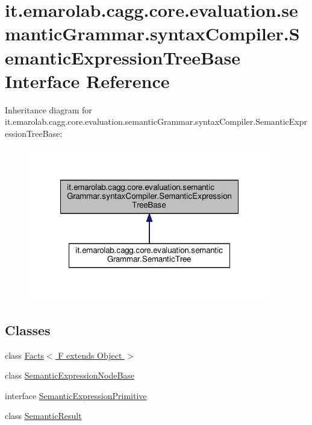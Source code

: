 \hypertarget{interfaceit_1_1emarolab_1_1cagg_1_1core_1_1evaluation_1_1semanticGrammar_1_1syntaxCompiler_1_1SemanticExpressionTreeBase}{\section{it.\-emarolab.\-cagg.\-core.\-evaluation.\-semantic\-Grammar.\-syntax\-Compiler.\-Semantic\-Expression\-Tree\-Base Interface Reference}
\label{interfaceit_1_1emarolab_1_1cagg_1_1core_1_1evaluation_1_1semanticGrammar_1_1syntaxCompiler_1_1SemanticExpressionTreeBase}
}


Inheritance diagram for it.\-emarolab.\-cagg.\-core.\-evaluation.\-semantic\-Grammar.\-syntax\-Compiler.\-Semantic\-Expression\-Tree\-Base\-:\nopagebreak
\begin{figure}[H]
\begin{center}
\leavevmode
\includegraphics[width=300pt]{interfaceit_1_1emarolab_1_1cagg_1_1core_1_1evaluation_1_1semanticGrammar_1_1syntaxCompiler_1_1Sef31807ec4d0212bc6fd9cf71e3d1ef47}
\end{center}
\end{figure}
\subsection*{Classes}
\begin{DoxyCompactItemize}
\item 
class \hyperlink{classit_1_1emarolab_1_1cagg_1_1core_1_1evaluation_1_1semanticGrammar_1_1syntaxCompiler_1_1Semanta17363eb7db3bfea12328c626a3d6723}{Facts$<$ F extends Object $>$}
\item 
class \hyperlink{classit_1_1emarolab_1_1cagg_1_1core_1_1evaluation_1_1semanticGrammar_1_1syntaxCompiler_1_1Semantec1f2fc886c35d505e2bc10592e2dff6}{Semantic\-Expression\-Node\-Base}
\item 
interface \hyperlink{interfaceit_1_1emarolab_1_1cagg_1_1core_1_1evaluation_1_1semanticGrammar_1_1syntaxCompiler_1_1Se776f6389441f31f1bb3271e5a57601d8}{Semantic\-Expression\-Primitive}
\item 
class \hyperlink{classit_1_1emarolab_1_1cagg_1_1core_1_1evaluation_1_1semanticGrammar_1_1syntaxCompiler_1_1Semant5d395032261986aec1b33357dd21b6bb}{Semantic\-Result}
\end{DoxyCompactItemize}
